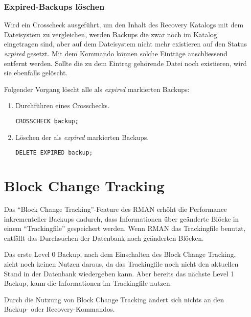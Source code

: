         \subsubsection{Expired-Backups l\"oschen}
          Wird ein Crosscheck ausgef\"uhrt, um den Inhalt des Recovery Katalogs
          mit dem Dateisystem zu vergleichen, werden Backups die zwar noch im
          Katalog eingetragen sind, aber auf dem Dateisystem nicht mehr
          existieren auf den Status \textit{expired} gesetzt. Mit dem Kommando
           k\"onnen solche Eintr\"age anschliessend
          entfernt werden. Sollte die zu dem Eintrag geh\"orende Datei noch
          existieren, wird sie ebenfalls gel\"oscht.

          Folgender Vorgang l\"oscht alle als \textit{expired} markierten
          Backups:
          \begin{enumerate}
            \item Durchf\"uhren eines Crosschecks.
              \begin{lstlisting}[caption={CROSSCHECK durchf\"uhren},label=admin1342,language=rman]
CROSSCHECK backup;
              \end{lstlisting}
            \item L\"oschen der als \textit{expired} markierten Backups.
              \begin{lstlisting}[caption={L\"oschen der Backups},label=admin1343,language=rman]
DELETE EXPIRED backup;
              \end{lstlisting}
          \end{enumerate}
      \section{Block Change Tracking}
        Das \enquote{Block Change Tracking}-Feature des RMAN erh\"oht die Performance inkrementeller Backups dadurch, dass Informationen \"uber ge\"anderte Bl\"ocke in einem \enquote{Trackingfile} gespeichert werden. Wenn RMAN das Trackingfile benutzt, entf\"allt das Durchsuchen der Datenbank nach ge\"anderten Bl\"ocken.

        Das erste Level 0 Backup, nach dem Einschalten des Block Change Tracking, zieht noch keinen Nutzen daraus, da das Trackingfile noch nicht den aktuellen Stand in der Datenbank wiedergeben kann. Aber bereits das n\"achste Level 1 Backup, kann die Informationen im Trackingfile nutzen.

        \begin{merke}
          Durch die Nutzung von Block Change Tracking \"andert sich nichts an den Backup- oder Recovery-Kommandos.
        \end{merke}

